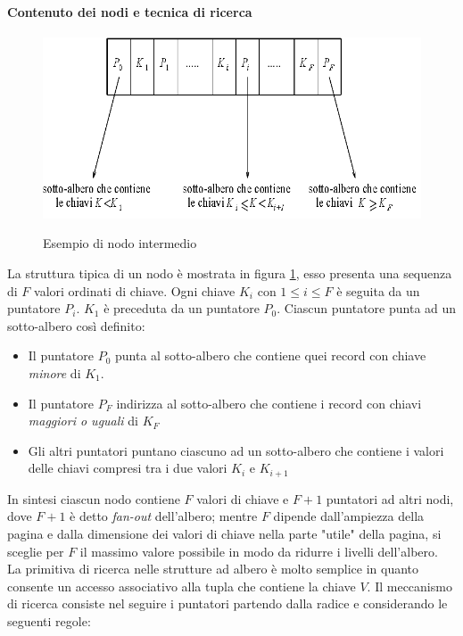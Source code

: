 \paragraph{Contenuto dei nodi e tecnica di ricerca}
\begin{figure}
  \centering
  \includegraphics[width=14cm]{img/nodo.png}\\
  \caption{Esempio di nodo intermedio}\label{fig:nodo}
\end{figure}
La struttura tipica di un nodo è mostrata in figura \ref{fig:nodo}, esso presenta una sequenza di $F$ valori ordinati di chiave. Ogni chiave $K_i$ con $1\leq i \leq F$ è seguita da un puntatore $P_i$. $K_1$ è preceduta da un puntatore $P_0$. Ciascun puntatore punta ad un sotto-albero così definito:
\begin{itemize}
  \item Il puntatore $P_0$ punta al sotto-albero che contiene quei record con chiave \emph{minore} di $K_1$.
  \item Il puntatore $P_F$ indirizza al sotto-albero che contiene i record con chiavi \emph{maggiori o uguali} di $K_F$
  \item Gli altri puntatori puntano ciascuno ad un sotto-albero che contiene i  valori delle chiavi compresi tra i due valori $K_i$ e $K_{i+1}$
\end{itemize}
In sintesi ciascun nodo contiene $F$ valori di chiave e $F+1$ puntatori ad altri nodi, dove $F+1$ è detto \emph{fan-out} dell'albero; mentre $F$ dipende dall'ampiezza della pagina e dalla dimensione dei valori di chiave nella parte "utile" della pagina, si sceglie per $F$ il massimo valore possibile in modo da ridurre i livelli dell'albero.\\
La primitiva di ricerca nelle strutture ad albero è molto semplice in quanto consente un accesso associativo alla tupla che contiene la chiave $V$. Il meccanismo di ricerca consiste nel seguire i puntatori partendo dalla radice e considerando le seguenti regole:
